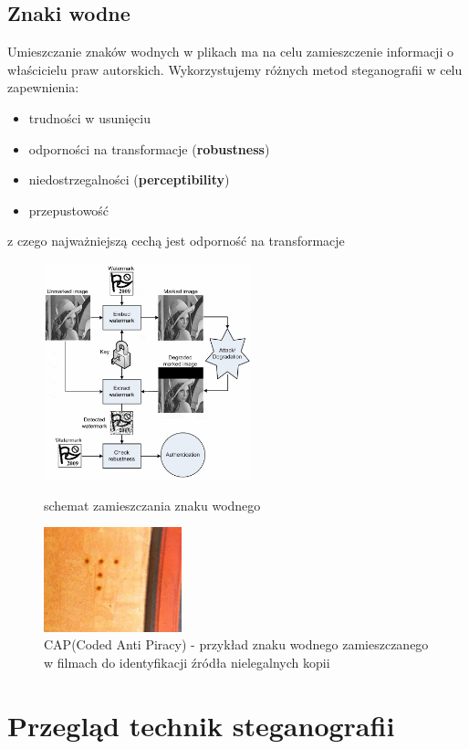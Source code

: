 \documentclass{article}
\begin{document}
\subsection{Znaki wodne}
Umieszczanie znaków wodnych w plikach ma na celu zamieszczenie informacji o właścicielu praw autorskich.
Wykorzystujemy różnych metod steganografii w celu zapewnienia:
\begin{itemize}
	\item trudności w usunięciu
	\item odporności na transformacje (\textbf{robustness})
	\item niedostrzegalności (\textbf{perceptibility})
	\item przepustowość
\end{itemize} 
z czego najważniejszą cechą jest odporność na transformacje
\begin{figure}[H]
	\centering
	\includegraphics[width=6cm]{watermark}
	\caption{schemat zamieszczania znaku wodnego}
	\includegraphics[width=4cm]{cap}
	\caption{CAP(Coded Anti Piracy) - przykład znaku wodnego zamieszczanego w filmach do identyfikacji źródła nielegalnych kopii}
\end{figure}
\section{Przegląd technik steganografii}
\end{document}
